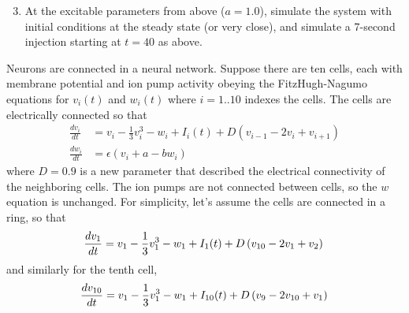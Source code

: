 \documentclass{exam}
\begin{document}
\begin{enumerate}
\setcounter{enumi}{2}
\item At the excitable parameters from above ($a=1.0$), simulate the system with initial conditions at the steady state (or very close), and simulate a 7-second injection starting at $t=40$ as above.
\end{enumerate}


Neurons are connected in a neural network. Suppose there are ten cells, each with membrane potential and ion pump activity obeying the FitzHugh-Nagumo equations for $v_i(t)$ and $w_i(t)$ where $i=1..10$ indexes the cells. The cells are electrically connected so that 
 \begin{align}
 \frac{d v_i}{dt} &= v_i - \frac{1}{3} v_i^3 - w_i +I_i(t) + D\left( v_{i-1} - 2 v_i + v_{i+1}\right)\\
 \frac{d w_i}{dt} &= \epsilon \left( v_i + a - bw_i\right) 
 \end{align}
where $D=0.9$ is a new parameter that described the electrical connectivity of the neighboring cells. The ion pumps are not connected between cells, so the $w$ equation is unchanged. For simplicity, let's assume the cells are connected in a ring, so that 
\begin{equation}
 \frac{d v_1}{dt} = v_1 - \frac{1}{3} v_1^3 - w_1 +I_1(t) + D\left( v_{10} - 2 v_1 + v_{2}\right)\\
\end{equation}
and similarly for the tenth cell,
\begin{equation}
 \frac{d v_{10}}{dt} = v_1 - \frac{1}{3} v_1^3 - w_1 +I_{10}(t) + D\left( v_{9} - 2 v_{10} + v_{1}\right)\\
\end{equation}
\end{document}
